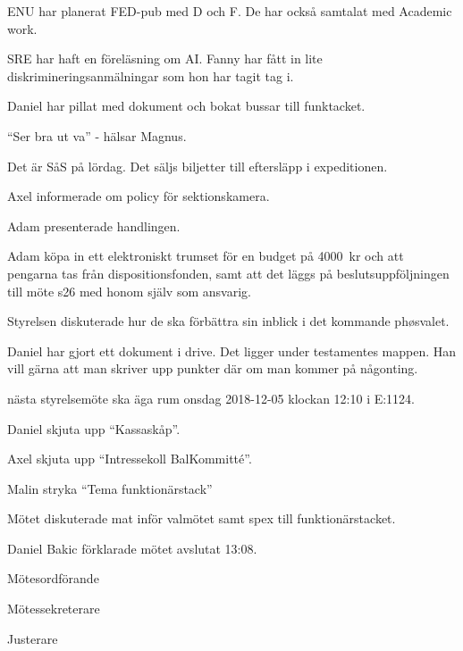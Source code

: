 \documentclass[10pt]{article}
\def\mo{Daniel Bakic}
\def\ms{Axel Voss}
\def\ji{Elin Johansson}
\begin{document}
\begin{paragrafer}
\begin{paragrafer}
		ENU har planerat FED-pub med D och F. De har också samtalat med Academic work.

		SRE har haft en föreläsning om AI. Fanny har fått in lite diskrimineringsanmälningar som hon har tagit tag i.

		Daniel har pillat med dokument och bokat bussar till funktacket. 


		``Ser bra ut va'' - hälsar Magnus. 


		Det är SåS på lördag. Det säljs biljetter till eftersläpp i expeditionen.  


		Axel informerade om policy för sektionskamera.

	\end{paragrafer}


		Adam presenterade handlingen. 

		Adam \ypa köpa in ett elektroniskt trumset för en budget på \SI{4000}{kr} och att pengarna tas från dispositionsfonden, samt att det läggs på beslutsuppföljningen till möte s26 med honom själv som ansvarig.

		\Mbaby
	
	Styrelsen diskuterade hur de ska förbättra sin inblick i det kommande phøsvalet.
	
	

	Daniel har gjort ett dokument i drive. Det ligger under testamentes mappen. 
	Han vill gärna att man skriver upp punkter där om man kommer på någonting. 


	\Mba nästa styrelsemöte ska äga rum onsdag 2018-12-05 klockan 12:10 i E:1124.


	Daniel \ypa skjuta upp ``Kassaskåp''.

	Axel \ypa skjuta upp ``Intressekoll BalKommitté''.

	Malin \ypa stryka ``Tema funktionärstack''
	
	\Mbabay


	Mötet diskuterade mat inför valmötet samt spex till funktionärstacket. 

	
	{\mo} förklarade mötet avslutat 13:08.

\end{paragrafer}

\hidesignfoot
\begin{signatures}{3}
	\signature{\mo}{Mötesordförande}
	\signature{\ms}{Mötessekreterare}
	\signature{\ji}{Justerare}
\end{signatures}
\end{document}
